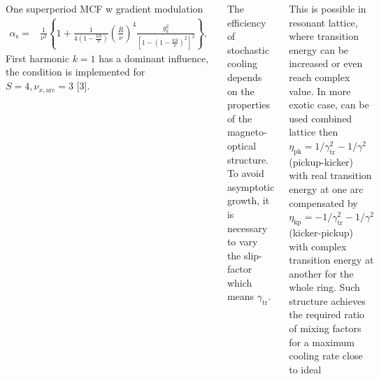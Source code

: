\documentclass[25pt, a0paper, portrait, blockverticalspace=.5cm]{tikzposter}
\begin{document}
\begin{columns}
{\begin{minipage}{0.325\linewidth}
		\end{minipage}
		\hfill
		\begin{minipage}{0.35\linewidth}
			One superperiod MCF w gradient modulation
			\begin{equation*}
				\begin{aligned}
					\alpha_{\text{s}}= & \frac{1}{\nu^2}\left\{1+\frac{1}{4(1-\frac{k S}{\nu})}\left(\frac{\bar{R}}{\nu}\right)^4 \frac{g_k^2}{\left[1-\left(1-\frac{k S}{\nu}\right)^2\right]^2}\right\},
				\end{aligned}
				\label{eq:alpha_gradient}
			\end{equation*}
			\noindent First harmonic $k=1$ has a dominant influence, the condition is implemented for $S=4, \nu_{x, \text{arc}}=3$ [3].
			\newline
			 \par The efficiency of stochastic cooling depends on the properties of the magneto-optical structure. To avoid asymptotic growth, it is necessary to vary the slip-factor which means $\gamma_{\text{tr}}$.
		\end{minipage}
		\hfill
		\begin{minipage}{0.30\linewidth}
		 This is possible in resonant lattice, where transition energy can be increased or even reach complex value. 
		 \newline \newline
		 In more exotic case, can be used combined lattice then $\eta_{\textrm{pk}}=1/\gamma_{\textrm{tr}}^2-1/\gamma^2$ (pickup-kicker) with real transition energy at one arc compensated by $\eta_{\textrm{kp}}=-1/\gamma_{\textrm{tr}}^2-1/\gamma^2$ (kicker-pickup) with complex transition energy at another for the whole ring. Such structure achieves the required ratio of mixing factors for a maximum cooling rate close to ideal
		\end{minipage}

}
\end{columns}
\end{document}
